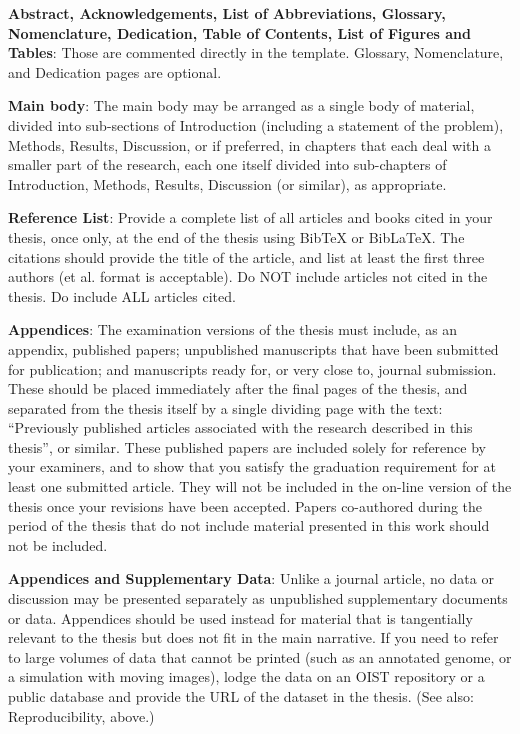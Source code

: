 \textbf{Abstract, Acknowledgements, List of Abbreviations, Glossary, Nomenclature, Dedication, Table of Contents, List of Figures and Tables}: Those are commented directly in the template. Glossary, Nomenclature, and Dedication pages are optional.

\textbf{Main body}:  The main body may be arranged as a single body of material, divided into sub-sections of Introduction (including a statement of the problem), Methods, Results, Discussion, or if preferred, in chapters that each deal with a smaller part of the research, each one itself divided into sub-chapters of Introduction, Methods, Results, Discussion (or similar), as appropriate. 

\textbf{Reference List}:  Provide a complete list of all articles and books cited in your thesis, once only, at the end of the thesis using BibTeX or BibLaTeX. The citations should provide the title of the article, and list at least the first three authors (et al. format is acceptable).  Do NOT include articles not cited in the thesis. Do include ALL articles cited.

\textbf{Appendices}: The examination versions of the thesis must include, as an appendix, published papers; unpublished manuscripts that have been submitted for publication; and manuscripts ready for, or very close to, journal submission.  These should be placed immediately after the final pages of the thesis, and separated from the thesis itself by a single dividing page with the text: ``Previously published articles associated with the research described in this thesis'', or similar. These published papers are included solely for reference by your examiners, and to show that you satisfy the graduation requirement for at least one submitted article.  They will not be included in the on-line version of the thesis once your revisions have been accepted. Papers co-authored during the period of the thesis that do not include material presented in this work should not be included.

\textbf{Appendices and Supplementary Data}: Unlike a journal article, no data or discussion may be presented separately as unpublished supplementary documents or data.  Appendices should be used instead for material that is tangentially relevant to the thesis but does not fit in the main narrative. If you need to refer to large volumes of data that cannot be printed (such as an annotated genome, or a simulation with moving images), lodge the data on an OIST repository or a public database and provide the URL of the dataset in the thesis.  (See also: Reproducibility, above.)


